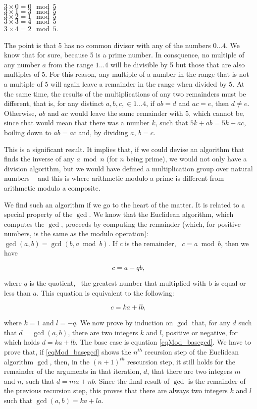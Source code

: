 \documentclass{scrreprt}
\begin{document}
$3 \times 0 = 0 \mod 5$\\
$3 \times 1 = 3 \mod 5$\\
$3 \times 2 = 1 \mod 5$\\
$3 \times 3 = 4 \mod 5$\\
$3 \times 4 = 2 \mod 5$.

The point is that 5 has no common divisor
with any of the numbers $0\dots 4$.
We know that for sure,
because 5 is a prime number.
In consquence, no multiple of any number $a$ 
from the range $1\dots 4$ will be divisible by 5
but those that are also multiples of 5.
For this reason, any multiple of a number in the range
that is not a multiple of 5
will again leave a remainder in the range when divided by 5.
At the same time, the results of the multiplications
of any two remainders must be different,
that is, for any distinct $a,b,c, \in 1\dots 4$,
if $ab = d$ and $ac = e$, then $d \neq e$.
Otherwise, $ab$ and $ac$ would leave the same remainder
with 5, which cannot be, since that would mean that
there was a number $k$, such that $5k + ab = 5k + ac$,
boiling down to $ab = ac$ and, by dividing $a$, $b = c$.

This is a significant result.
It implies that, if we could devise an algorithm
that finds the inverse of any $a \bmod n$
(for $n$ being prime), we would not only have 
a division algorithm, but we would have defined
a multiplication group over natural numbers --
and this is where arithmetic modulo a prime
is different from arithmetic modulo a composite.

We find such an algorithm if we go to the 
heart of the matter.
It is related to a special property of the $\gcd$.
We know that the Euclidean algorithm,
which computes the $\gcd$,
proceeds by computing the remainder
(which, for positive numbers,
is the same as the modulo operation):
$\gcd(a,b) = \gcd(b, a \bmod b)$.
If $c$ is the remainder, \ie\
$c = a \bmod b$, then we have

\begin{equation}\label{eqMod_rem}
c = a - qb,
\end{equation}

where $q$ is the quotient, \ie\ the greatest number
that multiplied with b is equal or less than $a$.
This equation is equivalent to the following:

\begin{equation}\label{eqMod_basegcd}
c = ka + lb,
\end{equation}

where $k = 1$ and $l = -q$.
We now prove by induction on $\gcd$ that, for any $d$ such that
$d = \gcd(a,b)$, there are two integers $k$ and $l$,
positive or negative, for which holds $d = ka + lb$.
The base case is equation \ref{eqMod_basegcd}.
We have to prove that, if \ref{eqMod_basegcd}
shows the $n^{th}$ recursion step of the Euclidean algorithm $\gcd$, 
then, in the $(n+1)^{th}$ rescursion step,
it still holds for the remainder of the arguments
in that iteration, $d$, that there are two integers
$m$ and $n$, such that $d = ma + nb$.
Since the final result of $\gcd$ is the remainder 
of the previous recursion step,
this proves that there are always two integers $k$ and $l$
such that $\gcd(a,b) = ka + la$.
\end{document}
